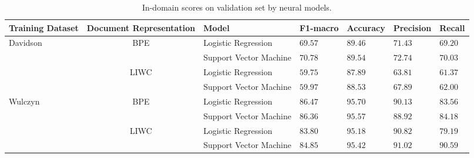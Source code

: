 \begin{landscape}
\begin{table}[]
\centering
\begin{tabular}{lclllll}
Training Dataset          & Document Representation  & Model                   & F1-macro & Accuracy & Precision & Recall  \\ \hline
\multirow{4}{*}{Davidson} & \multirow{2}{*}{BPE}     & Logistic Regression     & $69.57$  & $89.46$  & $71.43$   & $69.20$  \\
                          &                          & Support Vector Machine  & $70.78$  & $89.54$  & $72.74$   & $70.03$  \\
                          & \multirow{2}{*}{LIWC}    & Logistic Regression     & $59.75$  & $87.89$  & $63.81$   & $61.37$  \\
                          &                          & Support Vector Machine  & $59.97$  & $88.53$  & $67.89$   & $62.00$  \\
\multirow{4}{*}{Wulczyn}  & \multirow{2}{*}{BPE}     & Logistic Regression     & $86.47$  & $95.70$  & $90.13$   & $83.56$  \\
                          &                          & Support Vector Machine  & $86.36$  & $95.57$  & $88.92$   & $84.18$  \\
                          & \multirow{2}{*}{LIWC}    & Logistic Regression     & $83.80$  & $95.18$  & $90.82$   & $79.19$  \\
                          &                          & Support Vector Machine  & $84.85$  & $95.42$  & $91.02$   & $90.59$
\end{tabular}%
\caption{In-domain scores on validation set by neural models.}
\label{tab:redux_linear_baselines_dev}
\end{table}
\end{landscape}


